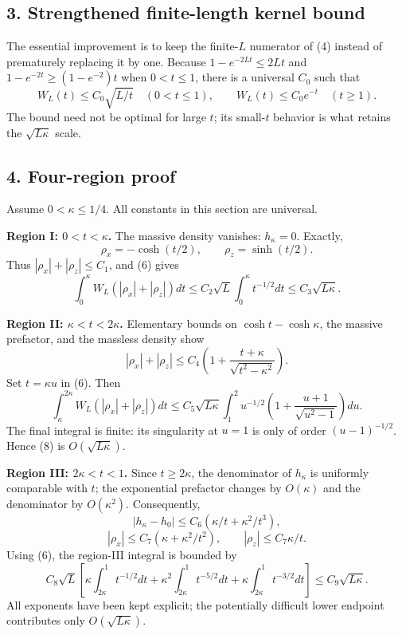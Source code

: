 \documentclass[
  10pt,
  a4paper,
]{article}
\begin{document}
\subsection{3. Strengthened finite-length kernel bound}\label{strengthened-finite-length-kernel-bound}

The essential improvement is to keep the finite-\(L\) numerator of (4) instead of prematurely replacing it by one. Because \(1-e^{-2Lt}\le2Lt\) and \(1-e^{-2t}\ge (1-e^{-2})t\) when \(0<t\le1\), there is a universal \(C_0\) such that \[
 \boxed{W_L(t)\le C_0\sqrt{L/t}\quad(0<t\le1),\qquad
 W_L(t)\le C_0e^{-t}\quad(t\ge1).}\tag{6}
\] The bound need not be optimal for large \(t\); its small-\(t\) behavior is what retains the \(\sqrt{L\kappa}\) scale.

\subsection{4. Four-region proof}\label{four-region-proof}

Assume \(0<\kappa\le1/4\). All constants in this section are universal.

\textbf{Region I: \(0<t<\kappa\).} The massive density vanishes: \(h_\kappa=0\). Exactly, \[
 \rho_x=-\cosh(t/2),\qquad \rho_z=\sinh(t/2).
\] Thus \(|\rho_x|+|\rho_z|\le C_1\), and (6) gives \[
 \int_0^\kappa W_L(|\rho_x|+|\rho_z|)dt
 \le C_2\sqrt L\int_0^\kappa t^{-1/2}dt
 \le C_3\sqrt{L\kappa}.
\tag{7}
\]

\textbf{Region II: \(\kappa<t<2\kappa\).} Elementary bounds on \(\cosh t-\cosh\kappa\), the massive prefactor, and the massless density show \[
 |\rho_x|+|\rho_z|
 \le C_4\left(1+\frac{t+\kappa}{\sqrt{t^2-\kappa^2}}\right).
\] Set \(t=\kappa u\) in (6). Then \[
 \int_\kappa^{2\kappa}W_L(|\rho_x|+|\rho_z|)dt
 \le C_5\sqrt{L\kappa}
 \int_1^2u^{-1/2}\left(1+\frac{u+1}{\sqrt{u^2-1}}\right)du.
\tag{8}
\] The final integral is finite: its singularity at \(u=1\) is only of order \((u-1)^{-1/2}\). Hence (8) is \(O(\sqrt{L\kappa})\).

\textbf{Region III: \(2\kappa<t<1\).} Since \(t\ge2\kappa\), the denominator of \(h_\kappa\) is uniformly comparable with \(t\); the exponential prefactor changes by \(O(\kappa)\) and the denominator by \(O(\kappa^2)\). Consequently, \[
 |h_\kappa-h_0|\le C_6(\kappa/t+\kappa^2/t^3),
\] \[
 |\rho_x|\le C_7(\kappa+\kappa^2/t^2),
 \qquad |\rho_z|\le C_7\kappa/t.
\] Using (6), the region-III integral is bounded by \[
 C_8\sqrt L\left[
 \kappa\int_{2\kappa}^1t^{-1/2}dt
 +\kappa^2\int_{2\kappa}^1t^{-5/2}dt
 +\kappa\int_{2\kappa}^1t^{-3/2}dt\right]
 \le C_9\sqrt{L\kappa}.
\tag{9}
\] All exponents have been kept explicit; the potentially difficult lower endpoint contributes only \(O(\sqrt{L\kappa})\).
\end{document}

